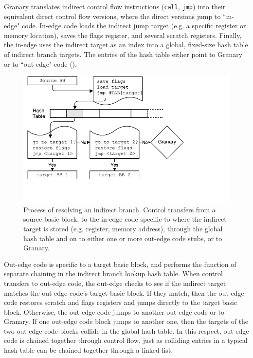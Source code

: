 \documentclass[preprint]{sigplanconf}
\begin{document}
Granary translates indirect control flow instructions (\texttt{call}, \texttt{jmp}) into their equivalent direct control flow versions, where the direct versions jump to ``in-edge" code. In-edge code loads the indirect jump target (e.g. a specific register or memory location), saves the flags register, and several scratch registers. Finally, the in-edge uses the indirect target as an index into a global, fixed-size hash table of indirect branch targets. The entries of the hash table either point to Granary or to ``out-edge" code (). 

\begin{figure}[t!]
\hspace{4em}\includegraphics[width=0.9\columnwidth]{diagrams/ibl.pdf}\vspace{-3em}
\caption{\label{fig:ibl}Process of resolving an indirect branch. Control transfers from a source basic block, to the in-edge code specific to where the indirect target is stored (e.g. register, memory address), through the global hash table and on to either one or more out-edge code stubs, or to Granary.}
\end{figure}

Out-edge code is specific to a target basic block, and performs the function of separate chaining in the indirect branch lookup hash table. When control transfers to out-edge code, the out-edge checks to see if the indirect target matches the out-edge code's target basic block. If they match, then the out-edge code restores scratch and flags registers and jumps directly to the target basic block. Otherwise, the out-edge code jumps to another out-edge code or to Granary. If one out-edge code block jumps to another one, then the targets of the two out-edge code blocks collide in the global hash table. In this respect, out-edge code is chained together through control flow, just as colliding entries in a typical hash table can be chained together through a linked list.
\end{document}
